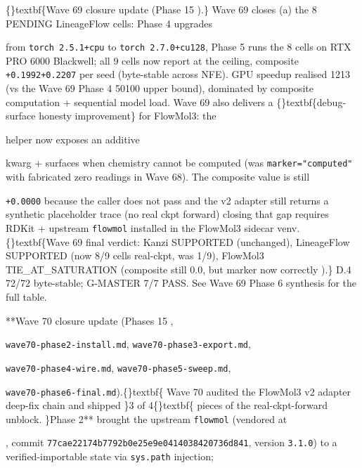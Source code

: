 \documentclass{article}
\begin{document}
\{\}textbf\{Wave 69 closure update (Phase 15  ).\} Wave 69 closes (a) the 8 PENDING LineageFlow cells: Phase 4 upgrades

 from \texttt{torch 2.5.1+cpu} to \texttt{torch 2.7.0+cu128}, Phase 5 runs the 8 cells on RTX PRO 6000 Blackwell; all 9 cells now report  at the  ceiling, composite \texttt{+0.1992}\texttt{+0.2207} per seed (byte-stable across NFE). GPU speedup realised 1213 (vs the Wave 69 Phase 4 50100 upper bound), dominated by composite computation + sequential model load. Wave 69 also delivers a \{\}textbf\{debug-surface honesty improvement\} for FlowMol3: the

 helper now exposes an additive

 kwarg + surfaces  when chemistry cannot be computed (was \texttt{marker="computed"} with fabricated zero readings in Wave 68). The composite value is still

\texttt{+0.0000} because the caller does not pass  and the v2 adapter still returns a synthetic placeholder trace (no real ckpt forward)  closing that gap requires RDKit + upstream \texttt{flowmol} installed in the FlowMol3 sidecar venv. \{\}textbf\{Wave 69 final verdict: Kanzi SUPPORTED (unchanged), LineageFlow SUPPORTED (now 8/9 cells real-ckpt, was 1/9), FlowMol3 TIE\_AT\_SATURATION (composite still 0.0, but marker now correctly ).\} D.4 72/72 byte-stable; G-MASTER 7/7 PASS. See Wave 69 Phase 6 synthesis for the full table.

**Wave 70 closure update (Phases 15  ,

\texttt{wave70-phase2-install.md}, \texttt{wave70-phase3-export.md},

\texttt{wave70-phase4-wire.md}, \texttt{wave70-phase5-sweep.md},

\texttt{wave70-phase6-final.md}).\{\}textbf\{ Wave 70 audited the FlowMol3 v2 adapter deep-fix chain and shipped \}3 of 4\{\}textbf\{ pieces of the real-ckpt-forward unblock. \}Phase 2** brought the upstream \texttt{flowmol} (vendored at

, commit \texttt{77cae22174b7792b0e25e9e0414038420736d841}, version \texttt{3.1.0}) to a verified-importable state via \texttt{sys.path} injection;
\end{document}
